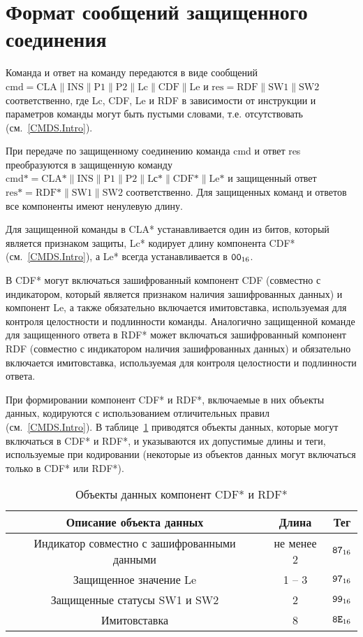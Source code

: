 \section{Формат сообщений защищенного соединения}
\label{CMDS.SM}

Команда и ответ на команду передаются в виде сообщений 
$\text{cmd} = \text{CLA} \parallel \text{INS} \parallel \text{P1} \parallel 
\text{P2} \parallel \text{Lc} \parallel \text{CDF} \parallel \text{Le}$ и 
$\text{res} = \text{RDF} \parallel \text{SW1} \parallel \text{SW2}$ 
соответственно, где 
Lc, CDF, Le и RDF в зависимости от инструкции и параметров команды могут 
быть пустыми словами, т.е. отсутствовать (см.~\ref{CMDS.Intro}). 

При передаче по защищенному соединению команда cmd и ответ res 
преобразуются в защищенную команду 
$\text{cmd*} = \text{CLA*} \parallel \text{INS} \parallel \text{P1} 
\parallel \text{P2} \parallel \text{Lс*} \parallel \text{CDF*} 
\parallel \text{Le*}$ и защищенный ответ 
$\text{res*} = \text{RDF*} \parallel \text{SW1} \parallel \text{SW2}$ 
соответственно. Для защищенных команд и ответов все компоненты имеют 
ненулевую длину. 

Для защищенной команды в CLA* устанавливается один из битов, который 
является признаком защиты, Lc* кодирует длину компонента CDF* 
(см.~\ref{CMDS.Intro}), а Le* всегда устанавливается в $\texttt{00}_{16}$.  

В CDF* могут включаться зашифрованный компонент CDF (совместно с 
индикатором, который является признаком наличия зашифрованных данных) и 
компонент Le, а также обязательно включается имитовставка, используемая 
для контроля целостности и подлинности команды.  Аналогично защищенной 
команде для защищенного ответа в RDF* может включаться зашифрованный 
компонент RDF (совместно с индикатором наличия зашифрованных данных) и 
обязательно включается имитовставка, используемая для контроля 
целостности и подлинности ответа. 

При формировании компонент CDF* и RDF*, включаемые в них объекты данных, 
кодируются с использованием отличительных правил (см.~\ref{CMDS.Intro}). 
В таблице~\ref{Table.CMDS.CDFRDF} 
приводятся объекты данных, которые могут включаться в CDF* и RDF*, и 
указываются их допустимые длины и теги, используемые при кодировании 
(некоторые из объектов данных могут включаться только в CDF* или RDF*). 

\begin{table}[h]
\caption{Объекты данных компонент CDF* и RDF*}
\label{Table.CMDS.CDFRDF}
\begin{tabular}{|c|c|c|}
\hline
Описание объекта данных & Длина & Тег \\
\hline
\hline
Индикатор совместно с зашифрованными данными & не менее 2 & $\texttt{87}_{16}$ \\
\hline
Защищенное значение Le & 1 -- 3 & $\texttt{97}_{16}$\\
\hline
Защищенные статусы SW1 и SW2 & 2 & $\texttt{99}_{16}$ \\
\hline      
Имитовставка & 8 & $\texttt{8E}_{16}$ \\
\hline
\end{tabular}
\end{table}

